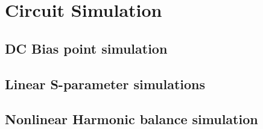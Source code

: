 \chapter{Circuit Simulation}

  \section{DC Bias point simulation}

  \section{Linear S-parameter simulations}

  \section{Nonlinear Harmonic balance simulation}
    

